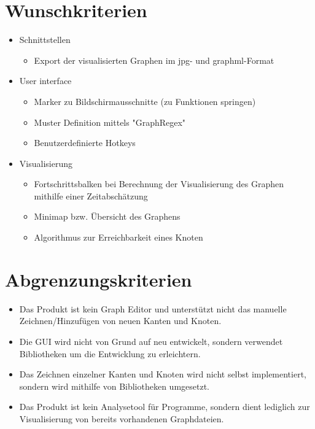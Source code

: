 \section{Wunschkriterien}

\begin{itemize}
\item Schnittstellen
\begin{itemize}
\item Export der visualisierten Graphen im \gls{jpg}- und \gls{graphml}-Format
\end{itemize}
\item User interface
\begin{itemize}
\item Marker zu Bildschirmausschnitte (zu Funktionen springen)
\item Muster Definition mittels "GraphRegex"
\item Benutzerdefinierte Hotkeys
\end{itemize}
\item Visualisierung
\begin{itemize}
\item Fortschrittsbalken bei Berechnung der Visualisierung des Graphen mithilfe einer Zeitabschätzung
\item Minimap bzw. Übersicht des Graphens
\item Algorithmus zur Erreichbarkeit eines Knoten
\end{itemize}
\end{itemize}

\section{Abgrenzungskriterien}

\begin{itemize}
\item Das Produkt ist kein Graph Editor und unterstützt nicht das manuelle Zeichnen/Hinzufügen von neuen Kanten und Knoten.
\item Die GUI wird nicht von Grund auf neu entwickelt, sondern verwendet Bibliotheken um die Entwicklung zu erleichtern. 
\item Das Zeichnen einzelner Kanten und Knoten wird nicht selbst implementiert, sondern wird mithilfe von Bibliotheken umgesetzt.
\item Das Produkt ist kein Analysetool für Programme, sondern dient lediglich zur Visualisierung von bereits vorhandenen Graphdateien.
\end{itemize}